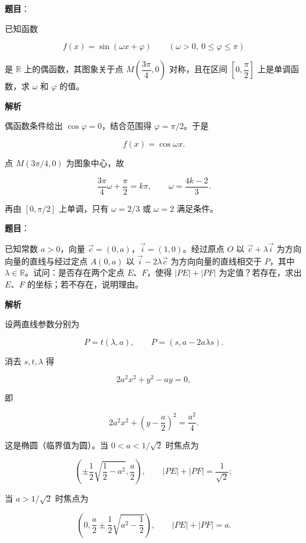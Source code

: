 \begin{answer}

\textbf{题目}：

已知函数

\nopagebreak[4]
\[
f(x)=\sin(\omega x+\varphi)\qquad(\omega>0,\ 0\leqslant\varphi\leqslant\pi)
\]

是 $\mathbb R$ 上的偶函数，其图象关于点 $M\left(\dfrac{3\pi}{4},0\right)$ 对称，且在区间 $\left[0,\dfrac\pi2\right]$ 上是单调函数，求 $\omega$ 和 $\varphi$ 的值。
\nopagebreak[4]
\begin{center}\end{center}
\nopagebreak[4]
\textbf{解析}

偶函数条件给出 $\cos\varphi=0$，结合范围得 $\varphi=\pi/2$。于是

\nopagebreak[4]
\[
f(x)=\cos\omega x.
\]

点 $M(3\pi/4,0)$ 为图象中心，故

\nopagebreak[4]
\[
\frac{3\pi}{4}\omega+\frac\pi2=k\pi,
\qquad
\omega=\frac{4k-2}{3}.
\]

再由 $[0,\pi/2]$ 上单调，只有 $\omega=2/3$ 或 $\omega=2$ 满足条件。


\end{answer}
\begin{answer}

\textbf{题目}：

已知常数 $a>0$，向量 $\vec c=(0,a)$，$\vec i=(1,0)$。经过原点 $O$ 以 $\vec c+\lambda\vec i$ 为方向向量的直线与经过定点 $A(0,a)$ 以 $\vec i-2\lambda\vec c$ 为方向向量的直线相交于 $P$，其中 $\lambda\in\mathbb R$。试问：是否存在两个定点 $E\text{、}F$，使得 $|PE|+|PF|$ 为定值？若存在，求出 $E\text{、}F$ 的坐标；若不存在，说明理由。

\textbf{解析}

设两直线参数分别为

\nopagebreak[4]
\[
P=t(\lambda,a),\qquad
P=(s,a-2a\lambda s).
\]

消去 $s,t,\lambda$ 得

\nopagebreak[4]
\[
2a^2x^2+y^2-ay=0,
\]

即

\nopagebreak[4]
\[
2a^2x^2+\left(y-\frac a2\right)^2=\frac{a^2}{4}.
\]

这是椭圆（临界值为圆）。当 $0<a<1/\sqrt2$ 时焦点为

\nopagebreak[4]
\[
\left(\pm\frac12\sqrt{\frac12-a^2},\frac a2\right),
\qquad |PE|+|PF|=\frac1{\sqrt2};
\]

当 $a>1/\sqrt2$ 时焦点为

\nopagebreak[4]
\[
\left(0,\frac a2\pm\frac12\sqrt{a^2-\frac12}\right),
\qquad |PE|+|PF|=a.
\]


\end{answer}